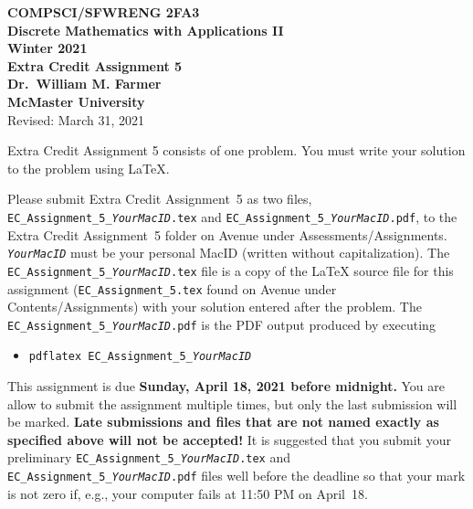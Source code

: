 \documentclass[11pt,fleqn]{article}
\newcommand{\bsp}{\begin{sloppypar}}
\newcommand{\esp}{\end{sloppypar}}
\begin{document}
\begin{center}

  {\large \textbf{COMPSCI/SFWRENG 2FA3}}\\[2mm]
  {\large \textbf{Discrete Mathematics with Applications II}}\\[2mm]
  {\large \textbf{Winter 2021}}\\[8mm]
  {\huge \textbf{Extra Credit Assignment 5}}\\[6mm]
  {\large \textbf{Dr.~William M. Farmer}}\\[2mm]
  {\large \textbf{McMaster University}}\\[6mm]
  {\large Revised: March 31, 2021}

\end{center}

\medskip

Extra Credit Assignment 5 consists of one problem.  You must write
your solution to the problem using LaTeX.

\bsp
Please submit Extra Credit Assignment~5 as two files,
\texttt{EC\_Assignment\_5\_\emph{YourMacID}.tex} and
\texttt{EC\_Assignment\_5\_\emph{YourMacID}.pdf}, to the Extra Credit
Assignment~5 folder on Avenue under Assessments/Assignments.
\texttt{\emph{YourMacID}} must be your personal MacID (written without
capitalization).  The \texttt{EC\_Assignment\_5\_\emph{YourMacID}.tex}
file is a copy of the LaTeX source file for this assignment
(\texttt{EC\_Assignment\_5.tex} found on Avenue under
Contents/Assignments) with your solution entered after the problem.
The \texttt{EC\_Assignment\_5\_\emph{YourMacID}.pdf} is the PDF output
produced by executing
\esp

\begin{itemize}

  \item[] \texttt{pdflatex EC\_Assignment\_5\_\emph{YourMacID}}

\end{itemize}

This assignment is due \textbf{Sunday, April 18, 2021 before
  midnight.}  You are allow to submit the assignment multiple times,
but only the last submission will be marked.  \textbf{Late submissions
  and files that are not named exactly as specified above will not be
  accepted!}  It is suggested that you submit your preliminary
\texttt{EC\_Assignment\_5\_\emph{YourMacID}.tex} and
\texttt{EC\_Assignment\_5\_\emph{YourMacID}.pdf} files well before the
deadline so that your mark is not zero if, e.g., your computer fails
at 11:50 PM on April~18.
\end{document}
